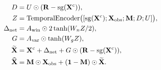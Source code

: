 \begin{equation}
 \begin{split}
 D&=U\odot(\mathbf{R}-\operatorname{sg}(\mathbf{X}^{\rm c})),\\
 Z&=\operatorname{TemporalEncoder}\bigl(
       [\operatorname{sg}(\mathbf{X}^{\rm c});\mathbf{X}_{\rm obs};\mathbf{M};D;U]\bigr),\\
 \Delta_{\rm net}&=A_{\rm win}\odot2\tanh(W_n Z/2),\\
 G&=A_{\rm var}\odot\tanh(W_g Z),\\
 \widetilde{\mathbf{X}}&=\mathbf{X}^{\rm c}+\Delta_{\rm net}
      +G\odot(\mathbf{R}-\operatorname{sg}(\mathbf{X}^{\rm c})),\\
 \widehat{\mathbf{X}}&=\mathbf{M}\odot\mathbf{X}_{\rm obs}+(\mathbf 1-\mathbf{M})\odot\widetilde{\mathbf{X}}.
 \end{split}\label{eq:refinement}
\end{equation}
